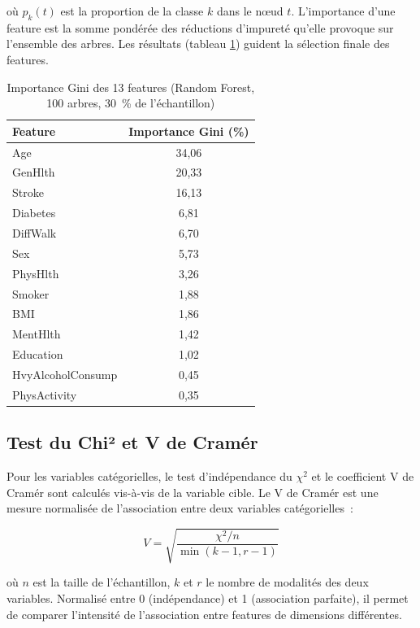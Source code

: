 où $p_k(t)$ est la proportion de la classe $k$ dans le nœud $t$. L'importance d'une feature est la somme pondérée des réductions d'impureté qu'elle provoque sur l'ensemble des arbres. Les résultats (tableau \ref{tab:gini}) guident la sélection finale des features.

\begin{table}[H]
\centering
\caption{Importance Gini des 13 features (Random Forest, 100 arbres, 30~\% de l'échantillon)}
\label{tab:gini}
\begin{tabular}{lc}
\toprule
\textbf{Feature} & \textbf{Importance Gini (\%)} \\
\midrule
Age               & 34,06 \\
GenHlth           & 20,33 \\
Stroke            & 16,13 \\
Diabetes          &  6,81 \\
DiffWalk          &  6,70 \\
Sex               &  5,73 \\
PhysHlth          &  3,26 \\
Smoker            &  1,88 \\
BMI               &  1,86 \\
MentHlth          &  1,42 \\
Education         &  1,02 \\
HvyAlcoholConsump &  0,45 \\
PhysActivity      &  0,35 \\
\bottomrule
\end{tabular}
\end{table}

\subsection{Test du Chi² et V de Cramér}

Pour les variables catégorielles, le test d'indépendance du $\chi^2$ et le coefficient V de Cramér sont calculés vis-à-vis de la variable cible. Le V de Cramér est une mesure normalisée de l'association entre deux variables catégorielles~:

\begin{equation}
V = \sqrt{\frac{\chi^2 / n}{\min(k-1, r-1)}}
\end{equation}

où $n$ est la taille de l'échantillon, $k$ et $r$ le nombre de modalités des deux variables. Normalisé entre 0 (indépendance) et 1 (association parfaite), il permet de comparer l'intensité de l'association entre features de dimensions différentes.

